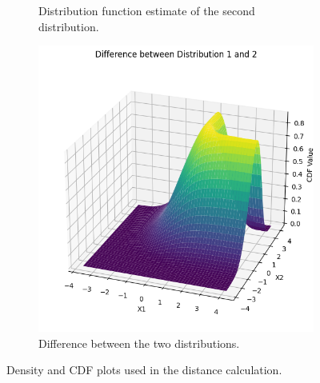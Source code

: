\begin{figure}
\begin{subfigure}{0.45\textwidth}
        \caption{Distribution function estimate of the second distribution.}
        \label{fig:dist2}
    \end{subfigure}
    
    \vfill
    \begin{subfigure}{0.45\textwidth}
        \centering
        \includegraphics[width=\textwidth]{3Theory/pictures/diffDist1and2.png}
        \caption{Difference between the two distributions.}
        \label{fig:diffDist1and2}
    \end{subfigure}
    \caption{Density and CDF plots used in the distance calculation.}
    \label{fig:ApproxWasserstein}
\end{figure}

